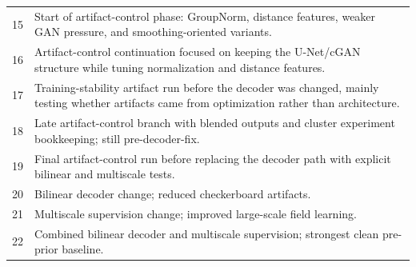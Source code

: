 \begin{table}[H]
\begin{tabularx}{\textwidth}{p{}>{\raggedright\arraybackslash}X}
15 & Start of artifact-control phase: GroupNorm, distance features, weaker GAN pressure, and smoothing-oriented variants. \\
16 & Artifact-control continuation focused on keeping the U-Net/cGAN structure while tuning normalization and distance features. \\
17 & Training-stability artifact run before the decoder was changed, mainly testing whether artifacts came from optimization rather than architecture. \\
18 & Late artifact-control branch with blended outputs and cluster experiment bookkeeping; still pre-decoder-fix. \\
19 & Final artifact-control run before replacing the decoder path with explicit bilinear and multiscale tests. \\
20 & Bilinear decoder change; reduced checkerboard artifacts. \\
21 & Multiscale supervision change; improved large-scale field learning. \\
22 & Combined bilinear decoder and multiscale supervision; strongest clean pre-prior baseline. \\
\bottomrule
\end{tabularx}
\end{table}
\normalsize

